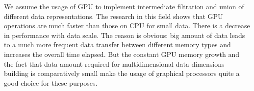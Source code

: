 \documentclass[10pt,journal,cspaper,compsoc]{IEEEtran}
\begin{document}
We assume the usage of GPU to implement intermediate filtration and union of
different data representations. The research in this field shows that GPU
operations are much faster than those on CPU for small data. There is a decrease
in performance with data scale. The reason is obvious: big amount of data leads
to a much more frequent data transfer between different memory types and
increases the overall time elapsed. But the constant GPU memory growth and the
fact that data amount required for multidimensional data dimensions building is
comparatively small make the usage of graphical processors quite a good choice
for these purposes.






%



\ifCLASSOPTIONcaptionsoff
  \newpage
\fi



\end{document}
